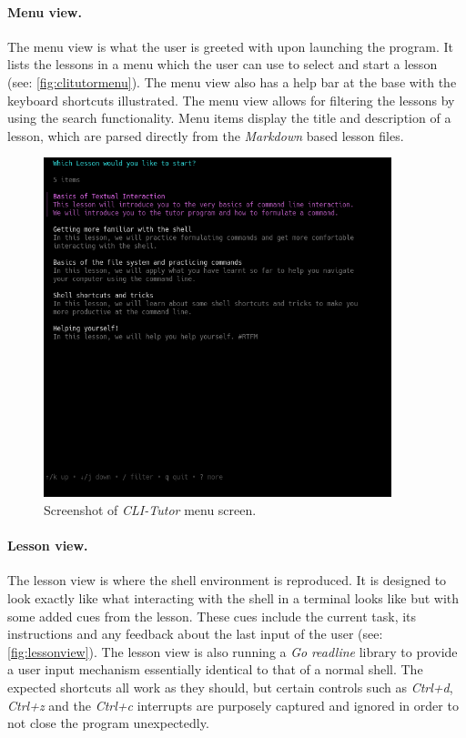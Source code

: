 \paragraph{Menu view.} The menu view is what the user is greeted with upon
launching the program. It lists the lessons in a menu which the user can use to
select and start a lesson (see: \autoref{fig:clitutormenu}). The menu view also
has a help bar at the base with the keyboard shortcuts illustrated. The menu
view allows for filtering the lessons by using the search functionality. Menu
items display the title and description of a lesson, which are parsed directly
from the \textit{Markdown} based lesson files.

\begin{figure}[htbp]
	\centering
	\includegraphics[width=0.9\textwidth]{img/menushort}
	\caption{Screenshot of \textit{CLI-Tutor} menu screen.}
	\label{fig:clitutormenu}
\end{figure}


\paragraph{Lesson view.} The lesson view is where the shell environment is
reproduced. It is designed to look exactly like what interacting with the shell
in a terminal looks like but with some added cues from the lesson. These cues
include the current task, its instructions and any feedback about the last
input of the user (see: \autoref{fig:lessonview}). The lesson view is also
running a \textit{Go} \textit{readline} library to provide a user input
mechanism essentially identical to that of a normal shell. The expected
shortcuts all work as they should, but certain controls such as
\textit{Ctrl+d}, \textit{Ctrl+z} and the \textit{Ctrl+c} interrupts are
purposely captured and ignored in order to not close the program unexpectedly.

